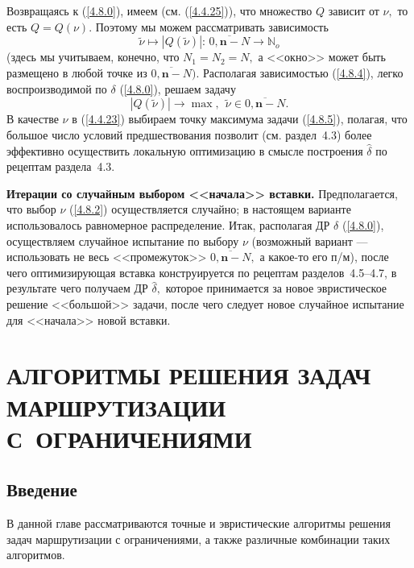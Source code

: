 \documentclass[11pt,twoside,openany]{report}
\newcommand{\bfn}{\begin{equation}}
\newcommand{\efn}{\end{equation}}
\newcommand{\ov}{\overline}
\newcommand{\bbn}{{\mathbb N}}
\newcommand{\nn}{{\mathbf n}}
\begin{document}
{{Возвращаясь к (\ref{4.8.0}), имеем (см. (\ref{4.4.25})), что множество $Q$ зависит от $\nu,$ то
есть $Q = Q(\nu).$ Поэтому мы можем рассматривать зависимость
\bfn\label{4.8.4}\tilde{\nu}\longmapsto |Q(\tilde{\nu})|:\,\ov{0,\nn-N} \longrightarrow \bbn_o
\efn
(здесь мы учитываем, конечно, что $N_1 = N_2 =N,$ а <<окно>> может быть размещено в любой точке
из $\ov{0,\nn-N}).$ Располагая зависимостью (\ref{4.8.4}), легко воспроизводимой по $\delta$
(\ref{4.8.0}), решаем задачу
\bfn\label{4.8.5}|Q(\tilde{\nu})| \longrightarrow \max,\ \ \tilde{\nu}\in \ov{0,\nn-N}.
\efn
В качестве $\nu$ в (\ref{4.4.23}) выбираем точку максимума задачи (\ref{4.8.5}), полагая, что
большое число условий предшествования позволит (см. раздел~4.3) более эффективно осуществить
локальную оптимизацию в смысле построения $\hat{\delta}$ по рецептам раздела~4.3.

{\bf Итерации со случайным выбором <<начала>> вставки.} Предполагается, что выбор $\nu$ (\ref{4.8.2})
осуществляется случайно; в настоящем варианте использовалось  равномерное распределение.
Итак, располагая ДР $\delta$ (\ref{4.8.0}), осуществляем случайное испытание по выбору $\nu$
(возможный вариант --- использовать не весь <<промежуток>> $\ov{0,\nn-N},$ а какое-то его п/м),
после чего оптимизирующая вставка конструируется по рецептам разделов~4.5--4.7, в результате
чего получаем ДР $\hat{\delta},$ которое принимается за новое эвристическое решение <<большой>>
задачи, после чего следует новое случайное испытание для <<начала>> новой вставки.

















\chapter{
  АЛГОРИТМЫ РЕШЕНИЯ ЗАДАЧ МАРШРУТИЗАЦИИ С~ОГРАНИЧЕНИЯМИ
}
\setcounter{chapter}{5}
\setcounter{equation}{0}



\section{
  Введение
}
\label{sect:5.1}

В данной главе рассматриваются точные и эвристические алгоритмы решения задач
маршрутизации с ограничениями, а также различные комбинации таких алгоритмов.

}}
\end{document}
